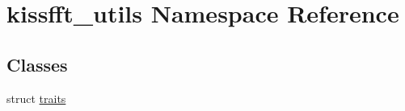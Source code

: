 \hypertarget{namespacekissfft__utils}{}\section{kissfft\+\_\+utils Namespace Reference}
\label{namespacekissfft__utils}
\subsection*{Classes}
\begin{DoxyCompactItemize}
\item 
struct \hyperlink{structkissfft__utils_1_1traits}{traits}
\end{DoxyCompactItemize}
